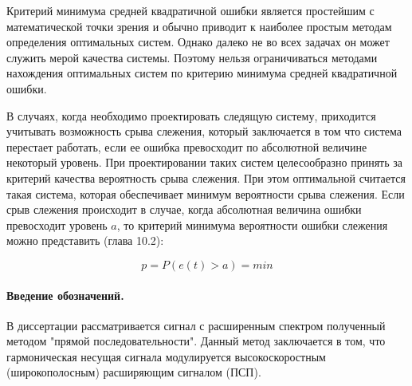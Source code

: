 Критерий минимума средней квадратичной ошибки является простейшим с математической точки зрения и обычно приводит
к наиболее простым методам определения оптимальных систем. Однако далеко не во всех задачах он может служить мерой
качества системы. Поэтому нельзя ограничиваться методами нахождения оптимальных систем по критерию минимума средней
квадратичной ошибки.

В случаях, когда необходимо проектировать следящую систему, приходится учитывать возможность срыва слежения,
который заключается в том что система перестает работать, если ее ошибка превосходит по абсолютной величине некоторый
уровень. При проектировании таких систем целесообразно принять за критерий качества вероятность срыва слежения. При
этом оптимальной считается такая система, которая обеспечивает минимум вероятности срыва слежения. Если срыв слежения
происходит в случае, когда абсолютная величина ошибки превосходит уровень $a$, то критерий минимума вероятности ошибки
слежения можно представить \cite{pugachev} (глава 10.2):
\begin{center}
\begin{equation}
	\label{eq:prob_lost_signal}
	p = P(e(t) > a) = min
\end{equation}
\end{center}

\paragraph{Введение обозначений.}
В диссертации рассматривается сигнал с расширенным спектром полученный методом "прямой последовательности".
Данный метод заключается в том, что гармоническая несущая сигнала модулируется высокоскоростным (широкополосным)
расширяющим сигналом (ПСП). 

